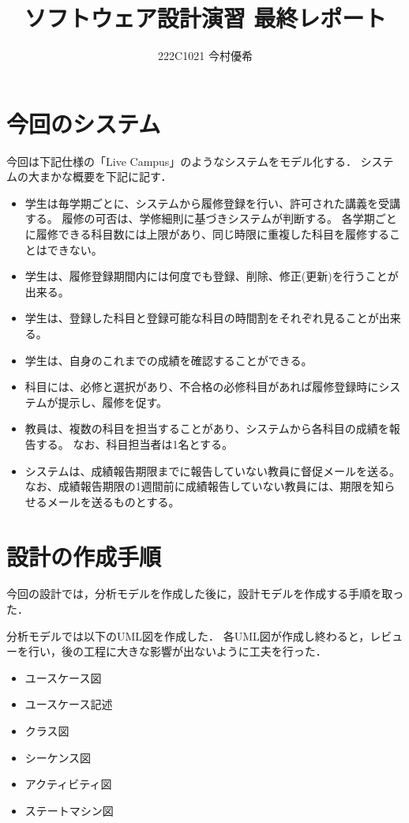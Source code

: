 \documentclass[documentclass]{jsarticle}
\begin{document}
\title{ソフトウェア設計演習 最終レポート}
\author{222C1021 今村優希}
\maketitle

\clearpage

\newpage

\section{今回のシステム}

今回は下記仕様の「Live Campus」のようなシステムをモデル化する．
システムの大まかな概要を下記に記す．

\begin{tcolorbox}
  \begin{itemize}
    \item 学生は毎学期ごとに、システムから履修登録を行い、許可された講義を受講する。
    履修の可否は、学修細則に基づきシステムが判断する。
    各学期ごとに履修できる科目数には上限があり、同じ時限に重複した科目を履修することはできない。
    \item 学生は、履修登録期間内には何度でも登録、削除、修正(更新)を行うことが出来る。
    \item 学生は、登録した科目と登録可能な科目の時間割をそれぞれ見ることが出来る。
    \item 学生は、自身のこれまでの成績を確認することができる。
    \item 科目には、必修と選択があり、不合格の必修科目があれば履修登録時にシステムが提示し、履修を促す。
    \item 教員は、複数の科目を担当することがあり、システムから各科目の成績を報告する。
    なお、科目担当者は1名とする。
    \item システムは、成績報告期限までに報告していない教員に督促メールを送る。
    なお、成績報告期限の1週間前に成績報告していない教員には、期限を知らせるメールを送るものとする。
  \end{itemize}
\end{tcolorbox}

\section{設計の作成手順}
今回の設計では，分析モデルを作成した後に，設計モデルを作成する手順を取った．

分析モデルでは以下のUML図を作成した．
各UML図が作成し終わると，レビューを行い，後の工程に大きな影響が出ないように工夫を行った．
\begin{itemize}
  \item ユースケース図
  \item ユースケース記述
  \item クラス図
  \item シーケンス図
  \item アクティビティ図
  \item ステートマシン図
\end{itemize}
\end{document}
